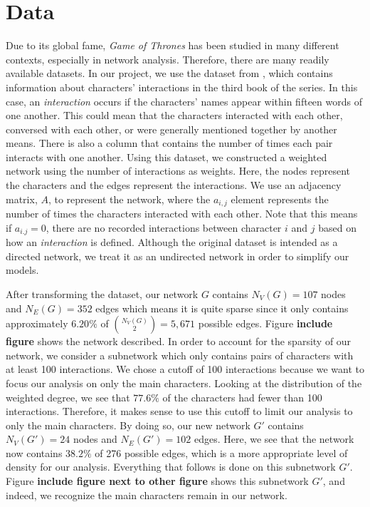 \documentclass{article}
\begin{document}
\section{Data}\label{Data}
Due to its global fame, \textit{Game of Thrones} has been studied in many different contexts, especially in network analysis. Therefore, there are many readily available datasets. In our project, we use the dataset from \cite{beveridge2016network}, which contains information about characters' interactions in the third book of the series. In this case, an \textit{interaction} occurs if the characters' names appear within fifteen words of one another. This could mean that the characters interacted with each other, conversed with each other, or were generally mentioned together by another means. There is also a column that contains the number of times each pair interacts with one another. Using this dataset, we constructed a weighted network using the number of interactions as weights. Here, the nodes represent the characters and the edges represent the interactions. We use an adjacency matrix, $A$, to represent the network, where the $a_{i,j}$ element represents the number of times the characters interacted with each other. Note that this means if $a_{i.j} = 0$, there are no recorded interactions between character $i$ and $j$ based on how an \textit{interaction} is defined. Although the original dataset is intended as a directed network, we treat it as an undirected network in order to simplify our models.

After transforming the dataset, our network $G$ contains $N_V(G) = 107$ nodes and $N_E(G) = 352$ edges which means it is quite sparse since it only contains approximately $6.20\%$ of ${N_V(G) \choose 2} = 5,671$ possible edges. Figure \textbf{include figure} shows the network described. In order to account for the sparsity of our network, we consider a subnetwork which only contains pairs of characters with at least 100 interactions. We chose a cutoff of 100 interactions because we want to focus our analysis on only the main characters. Looking at the distribution of the weighted degree, we see that $77.6\%$ of the characters had fewer than 100 interactions. Therefore, it makes sense to use this cutoff to limit our analysis to only the main characters. By doing so, our new network $G'$ contains $N_V(G') = 24$ nodes and $N_E(G') = 102$ edges. Here, we see that the network now contains $38.2\%$ of 276 possible edges, which is a more appropriate level of density for our analysis. Everything that follows is done on this subnetwork $G'$. Figure \textbf{include figure next to other figure} shows this subnetwork $G'$, and indeed, we recognize the main characters remain in our network.
\end{document}

